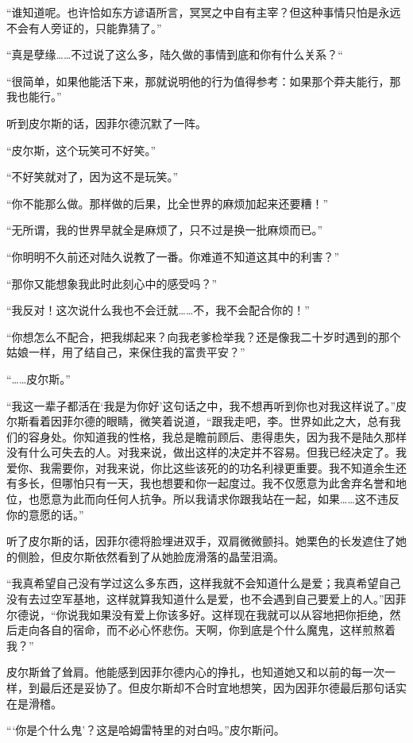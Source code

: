 “谁知道呢。也许恰如东方谚语所言，冥冥之中自有主宰？但这种事情只怕是永远不会有人旁证的，只能靠猜了。”

“真是孽缘……不过说了这么多，陆久做的事情到底和你有什么关系？“

“很简单，如果他能活下来，那就说明他的行为值得参考：如果那个莽夫能行，那我也能行。”

听到皮尔斯的话，因菲尔德沉默了一阵。

“皮尔斯，这个玩笑可不好笑。”

“不好笑就对了，因为这不是玩笑。”

“你不能那么做。那样做的后果，比全世界的麻烦加起来还要糟！”

“无所谓，我的世界早就全是麻烦了，只不过是换一批麻烦而已。”

“你明明不久前还对陆久说教了一番。你难道不知道这其中的利害？”

“那你又能想象我此时此刻心中的感受吗？”

“我反对！这次说什么我也不会迁就……不，我不会配合你的！”

“你想怎么不配合，把我绑起来？向我老爹检举我？还是像我二十岁时遇到的那个姑娘一样，用了结自己，来保住我的富贵平安？”

“……皮尔斯。”

“我这一辈子都活在‘我是为你好’这句话之中，我不想再听到你也对我这样说了。”皮尔斯看着因菲尔德的眼睛，微笑着说道，“跟我走吧，李。世界如此之大，总有我们的容身处。你知道我的性格，我总是瞻前顾后、患得患失，因为我不是陆久那样没有什么可失去的人。对我来说，做出这样的决定并不容易。但我已经决定了。我爱你、我需要你，对我来说，你比这些该死的的功名利禄更重要。我不知道余生还有多长，但哪怕只有一天，我也想要和你一起度过。我不仅愿意为此舍弃名誉和地位，也愿意为此而向任何人抗争。所以我请求你跟我站在一起，如果……这不违反你的意愿的话。”

听了皮尔斯的话，因菲尔德将脸埋进双手，双肩微微颤抖。她栗色的长发遮住了她的侧脸，但皮尔斯依然看到了从她脸庞滑落的晶莹泪滴。

“我真希望自己没有学过这么多东西，这样我就不会知道什么是爱；我真希望自己没有去过空军基地，这样就算我知道什么是爱，也不会遇到自己要爱上的人。”因菲尔德说，“你说我如果没有爱上你该多好。这样现在我就可以从容地把你拒绝，然后走向各自的宿命，而不必心怀悲伤。天啊，你到底是个什么魔鬼，这样煎熬着我？”

皮尔斯耸了耸肩。他能感到因菲尔德内心的挣扎，也知道她又和以前的每一次一样，到最后还是妥协了。但皮尔斯却不合时宜地想笑，因为因菲尔德最后那句话实在是滑稽。

“‘你是个什么鬼’？这是哈姆雷特里的对白吗。”皮尔斯问。

